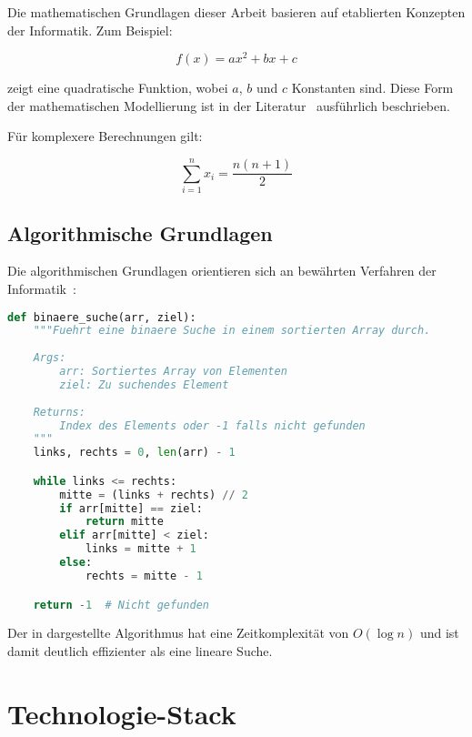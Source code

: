 Die mathematischen Grundlagen dieser Arbeit basieren auf etablierten Konzepten der Informatik. Zum Beispiel:

\begin{equation}
	f(x) = ax^2 + bx + c
	\label{eq:quadratic}
\end{equation}

 zeigt eine quadratische Funktion, wobei $a$, $b$ und $c$ Konstanten sind.
Diese Form der mathematischen Modellierung ist in der Literatur~\cite{example_book} ausführlich beschrieben.

Für komplexere Berechnungen gilt:

\begin{equation}
	\sum_{i=1}^{n} x_i = \frac{n(n+1)}{2}
	\label{eq:sum}
\end{equation}

\subsection{Algorithmische Grundlagen}
\label{subsec:algorithmic_foundations}

Die algorithmischen Grundlagen orientieren sich an bewährten Verfahren der Informatik~\cite{example_conference}:

\begin{lstlisting}[language=Python, caption=Beispielalgorithmus für binäre Suche, label=lst:algorithm]
def binaere_suche(arr, ziel):
    """Fuehrt eine binaere Suche in einem sortierten Array durch.
    
    Args:
        arr: Sortiertes Array von Elementen
        ziel: Zu suchendes Element
        
    Returns:
        Index des Elements oder -1 falls nicht gefunden
    """
    links, rechts = 0, len(arr) - 1

    while links <= rechts:
        mitte = (links + rechts) // 2
        if arr[mitte] == ziel:
            return mitte
        elif arr[mitte] < ziel:
            links = mitte + 1
        else:
            rechts = mitte - 1

    return -1  # Nicht gefunden
\end{lstlisting}

Der in  dargestellte Algorithmus hat eine Zeitkomplexität von $O(\log n)$ und ist damit deutlich effizienter als eine lineare Suche.

\section{Technologie-Stack}
\label{sec:technology_stack}

